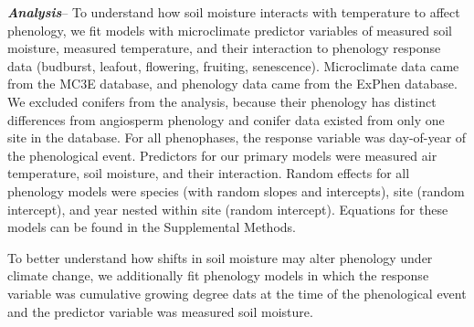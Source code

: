 \documentclass{article}
\begin{document}
\textbf {\emph{Analysis}}--
To understand how soil moisture interacts with temperature to affect phenology, we fit models with microclimate predictor variables of measured soil moisture, measured temperature, and their interaction to phenology response data (budburst, leafout, flowering, fruiting, senescence). Microclimate data came from the MC3E database, and phenology data came from the ExPhen database. We excluded conifers from the analysis, because their phenology has distinct differences from angiosperm phenology \cite{polgar2014} and conifer data existed from only one site in the database. For all phenophases, the response variable was day-of-year of the phenological event. Predictors for our primary models were measured air temperature, soil moisture, and their interaction. Random effects for all phenology models were species (with random slopes and intercepts), site (random intercept), and year nested within site (random intercept). Equations for these models can be found in the Supplemental Methods. 

\par To better understand how shifts in soil moisture may alter phenology under climate change, we additionally fit phenology models in which the response variable was cumulative growing degree dats at the time of the phenological event and the predictor variable was measured soil moisture.  
\end{document}
